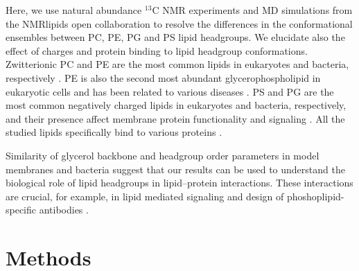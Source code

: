 \documentclass[aps,prl,superscriptaddress,twocolumn]{revtex4}
\begin{document}
Here, we use natural abundance $^{13}$C NMR experiments %
and MD simulations from the NMRlipids open collaboration
to resolve the differences in the conformational ensembles between PC, PE, PG and PS lipid headgroups.
We elucidate also the effect of charges and protein binding to lipid headgroup conformations.
Zwitterionic PC and PE are the most common lipids in eukaryotes and bacteria, respectively \cite{vanmeer08,sohlenkamp16}.
PE is also the second most abundant glycerophospholipid in eukaryotic cells
and has been related to various diseases \cite{vance15,calzada16,patel17}.
PS and PG are the most common negatively charged lipids in eukaryotes and bacteria, respectively,
and their presence affect membrane protein functionality and signaling \cite{lemmon08,leventis10,sohlenkamp16,hariharan18}.
All the studied lipids specifically bind to various proteins \cite{yeagle14}.

Similarity of glycerol backbone and headgroup order parameters in model membranes and bacteria \cite{gally81,scherer87,seelig90}
suggest that our results can be used to 
understand the biological role of lipid headgroups in lipid--protein interactions.
These interactions are crucial, for example, in lipid mediated signaling \cite{lemmon08} and
design of phoshoplipid-specific antibodies \cite{vigant15}. 



\section{Methods}
\end{document}
